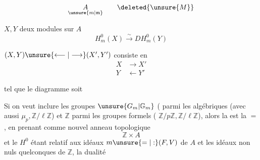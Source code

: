 
\[\underset{\unsure{m|\mathfrak m}}{A}\qquad\deleted{\unsure{M}}\]

$X,Y$ deux modules sur $A$
\[H^0_m(X)\xrightarrow{\sim}DH^0_m(Y)\]

$(X,Y)\unsure{\longleftarrow|\longrightarrow}(X',Y')$ consiste en
\[\begin{aligned}X&\longrightarrow X'\\Y&\longleftarrow Y'\end{aligned}\]

tel que le diagramme
soit 

Si on veut inclure les groupes $\unsure{G_m|\mathbb G_m}$ ( parmi les algébriques (avec aussi $\mu_p,\mathbb Z/\ell\mathbb Z$) et $\mathbb Z$ parmi les groupes formels ( $\mathbb Z/p\mathbb Z,\mathbb Z/\ell\mathbb Z$), alors la  est la $=$, en prenant comme nouvel anneau topologique
\[\mathbb Z\times A\]
et le $H^0$ étant relatif aux idéaux $m\unsure{=|:}(F,V)$ de $A$ et les idéaux non nuls quelconques de $\mathbb Z$, la dualité
